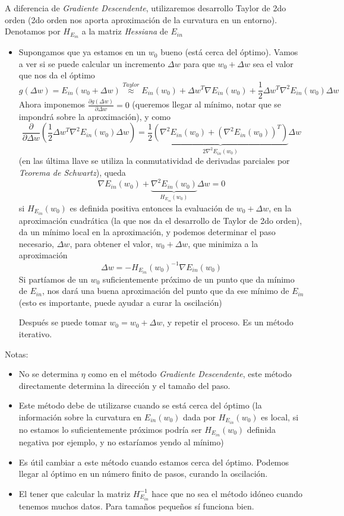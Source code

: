 \documentclass[11pt,a4paper]{article}
\theoremstyle{definition}
\begin{document}
	A diferencia de \textit{Gradiente Descendente}, utilizaremos desarrollo Taylor de 2do orden (2do orden nos aporta aproximación de la curvatura en un entorno). Denotamos por $H_{E_{in}}$ a la matriz \textit{Hessiana} de $E_{in}$
	\begin{itemize}	
	\item Supongamos que ya estamos en un $w_0$ bueno (está cerca del óptimo). Vamos a ver si se puede calcular un incremento $\Delta w$ para que $w_0+ \Delta w$ sea el valor que nos da el óptimo
	$$g(\Delta w)=E_{in}(w_0+\Delta w) \stackrel{Taylor}{\approx} E_{in}(w_0)+\Delta w^T\nabla E_{in}(w_0)+\frac{1}{2} \Delta w^T \nabla ^2 E_{in} (w_0)\Delta w$$
	Ahora imponemos $\frac{\partial g(\Delta w)}{\partial\Delta w}=0$ (queremos llegar al mínimo, notar que se impondrá sobre la aproximación), y como 
	$$\frac{\partial}{\partial \Delta w} \left( \frac{1}{2} \Delta w^T \nabla ^2 E_{in} (w_0)\Delta w \right) = \frac{1}{2} \underbrace{\left( \nabla ^2 E_{in}(w_0) + (\nabla ^2 
E_{in}(w_0))^T\right)}_{ 2 \nabla ^2 E_{in}(w_0) } \Delta w  $$  
	(en las última llave se utiliza la conmutatividad de derivadas parciales por \textit{Teorema de Schwartz}), queda
	$$\nabla E_{in}(w_0)+\underbrace{\nabla^2 E_{in}(w_0)}_{H_{E_{in}}(w_0)} \Delta w=0$$
si $H_{E_{in}}(w_0)$ es definida positiva entonces la evaluación de $w_0 + \Delta w$, en la aproximación cuadrática (la que nos da el desarrollo de Taylor de 2do orden), da un mínimo local en la aproximación, y podemos determinar el paso necesario, $\Delta w$, para obtener el valor, $w_0+\Delta w$, que minimiza a la aproximación
	$$\Delta w=-H_{E_{in}}(w_0)^{-1} \nabla E_{in} (w_0)$$
	Si partíamos de un $w_0$ suficientemente próximo de un punto que da mínimo de $E_{in}$, nos dará una buena aproximación del punto que da ese mínimo de $E_{in}$ (esto es importante, puede ayudar a curar la oscilación)
	
	Después se puede tomar $w_0=w_0 +\Delta w$, y repetir el proceso. Es un método iterativo.
	\end{itemize}
	Notas:
	
	\begin{itemize}
		\item No se determina $\eta$ como en el método \textit{Gradiente Descendente}, este método directamente determina la dirección y el tamaño del paso.
	
		\item Este método debe de utilizarse cuando se está cerca del óptimo (la información sobre la curvatura en $E_{in}(w_0)$ dada por $H_{E_{in}}(w_0)$ es local, si no estamos lo suficientemente próximos podría ser  $H_{E_{in}}(w_0)$ definida negativa por ejemplo, y no estaríamos yendo al mínimo)
	
		\item Es útil cambiar a este método cuando estamos cerca del óptimo. Podemos llegar al óptimo en un número finito de pasos, curando la oscilación.
	
		\item El tener que calcular la matriz $H_{E_{in}}^{-1}$ hace que no sea el método idóneo cuando tenemos muchos datos. Para tamaños pequeños sí funciona bien.
	\end{itemize} ~\\
	
\end{document}

